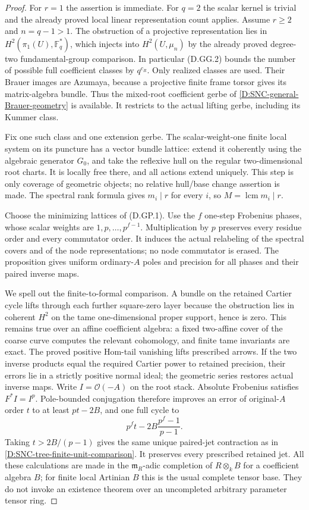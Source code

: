 \begin{proof}
For \(r=1\) the assertion is immediate. For \(q=2\)
the scalar kernel is trivial and the already proved
local linear representation count applies.
Assume \(r\geq2\) and \(n=q-1>1\).
The obstruction of a projective representation
lies in \(H^2(\pi_1(U),\mathbb F_q^*)\), which
injects into \(H^2(U,\mu_n)\) by the already proved
degree-two fundamental-group comparison. In
particular (D.GG.2) bounds the number of possible
full coefficient classes by \(q^{c_R}\).
Only realized classes are used. Their Brauer
images are Azumaya, because a projective finite
frame torsor gives its matrix-algebra bundle.
Thus the mixed-root coefficient gerbe of
\ref{D:SNC-general-Brauer-geometry} is available.
It restricts to the actual lifting gerbe,
including its Kummer class.

Fix one such class and one extension gerbe.
The scalar-weight-one finite local system on
its puncture has a vector bundle lattice:
extend it coherently using the algebraic
generator \(G_0\), and take the reflexive hull
on the regular two-dimensional root charts.
It is locally free there, and all actions
extend uniquely. This step is only coverage
of geometric objects; no relative hull/base
change assertion is made. The spectral rank
formula gives \(m_i\mid r\) for every \(i\),
so \(M=\operatorname{lcm}m_i\mid r\).

Choose the minimizing lattices of (D.GP.1).
Use the \(f\) one-step Frobenius phases, whose
scalar weights are \(1,p,\ldots,p^{f-1}\).
Multiplication by \(p\) preserves every residue
order and every commutator order. It induces
the actual relabeling of the spectral covers
and of the node representations; no node
commutator is erased. The proposition gives
uniform ordinary-\(A\) poles and precision for
all phases and their paired inverse maps.

We spell out the finite-to-formal comparison.
A bundle on the retained Cartier cycle lifts
through each further square-zero layer because
the obstruction lies in coherent \(H^2\) on
the tame one-dimensional proper support, hence
is zero. This remains true over an affine
coefficient algebra: a fixed two-affine cover
of the coarse curve computes the relevant
cohomology, and finite tame invariants are
exact. The proved positive Hom-tail vanishing
lifts prescribed arrows. If the two inverse
products equal the required Cartier power
to retained precision, their errors lie in
a strictly positive normal ideal; the
geometric series restores actual inverse
maps. Write \(I=\mathcal O(-A)\) on the root
stack. Absolute Frobenius satisfies
\(F^*I=I^p\). Pole-bounded conjugation therefore
improves an error of original-\(A\) order \(t\)
to at least \(pt-2B\), and one full cycle to
\[
           p^f t-2B\frac{p^f-1}{p-1}.                 \tag{D.GP.10}
\]
Taking \(t>2B/(p-1)\) gives the same unique
paired-jet contraction as in
\ref{D:SNC-tree-finite-unit-comparison}.
It preserves every prescribed retained jet.
All these calculations are made in the
\(\mathfrak m_R\)-adic completion of
\(R\otimes_k B\) for a coefficient algebra \(B\);
for finite local Artinian \(B\) this is the
usual complete tensor base. They do not
invoke an existence theorem over an
uncompleted arbitrary parameter tensor ring.


\end{proof}
